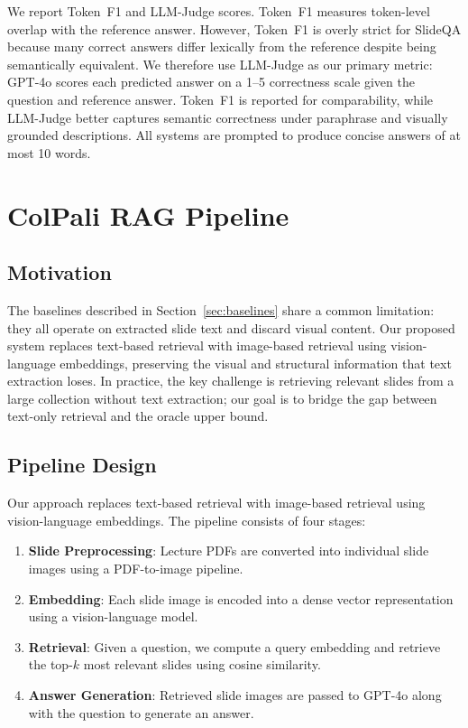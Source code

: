 \documentclass{article} %
\begin{document}
We report Token~F1 and LLM-Judge scores. Token~F1 measures token-level overlap with the reference answer. However, Token~F1 is overly strict for SlideQA because many correct answers differ lexically from the reference despite being semantically equivalent. We therefore use LLM-Judge as our primary metric: GPT-4o scores each predicted answer on a 1--5 correctness scale given the question and reference answer. Token~F1 is reported for comparability, while LLM-Judge better captures semantic correctness under paraphrase and visually grounded descriptions. All systems are prompted to produce concise answers of at most 10 words.

\section{ColPali RAG Pipeline}

\subsection{Motivation}

The baselines described in Section~\ref{sec:baselines} share a common limitation: they all operate on extracted slide text and discard visual content. Our proposed system replaces text-based retrieval with image-based retrieval using vision-language embeddings, preserving the visual and structural information that text extraction loses. In practice, the key challenge is retrieving relevant slides from a large collection without text extraction; our goal is to bridge the gap between text-only retrieval and the oracle upper bound.

\subsection{Pipeline Design}

Our approach replaces text-based retrieval with image-based retrieval using vision-language embeddings. The pipeline consists of four stages:

\begin{enumerate}[nosep]
    \item \textbf{Slide Preprocessing}: Lecture PDFs are converted into individual slide images using a PDF-to-image pipeline.
    \item \textbf{Embedding}: Each slide image is encoded into a dense vector representation using a vision-language model.
    \item \textbf{Retrieval}: Given a question, we compute a query embedding and retrieve the top-$k$ most relevant slides using cosine similarity.
    \item \textbf{Answer Generation}: Retrieved slide images are passed to GPT-4o along with the question to generate an answer.
\end{enumerate}
\end{document}
